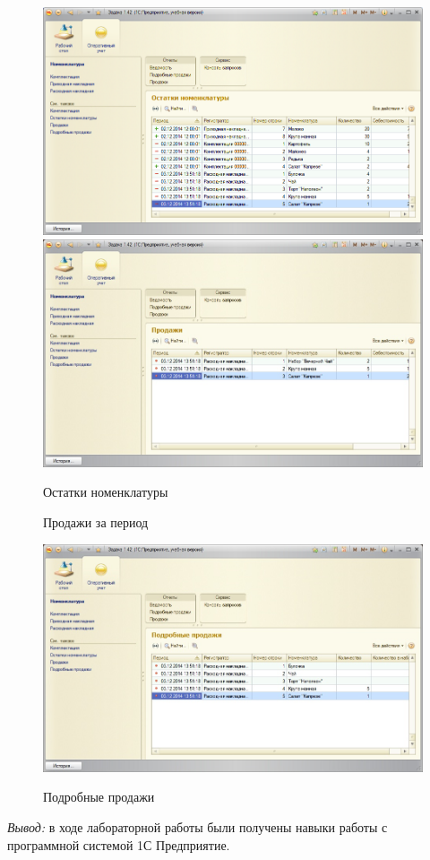\documentclass[12pt,pscyr]{hedlab}
\begin{document}
  \begin{figure}[h!]
    \includegraphics[width=.5\textwidth]{1c_5}
    \includegraphics[width=.5\textwidth]{1c_6}\\
    \parbox{.5\textwidth}{\caption{Остатки номенклатуры}}
    \parbox{.5\textwidth}{\caption{Продажи за период}}
  \end{figure}
  
  \begin{figure}[h!]
    \center
    \includegraphics[width=.5\textwidth]{1c_7} \\
    \parbox{.5\textwidth}{\caption{Подробные продажи}}
  \end{figure}
 
  \emph{Вывод:} в ходе лабораторной работы были получены навыки работы с
  программной системой 1С Предприятие.
\end{document}
